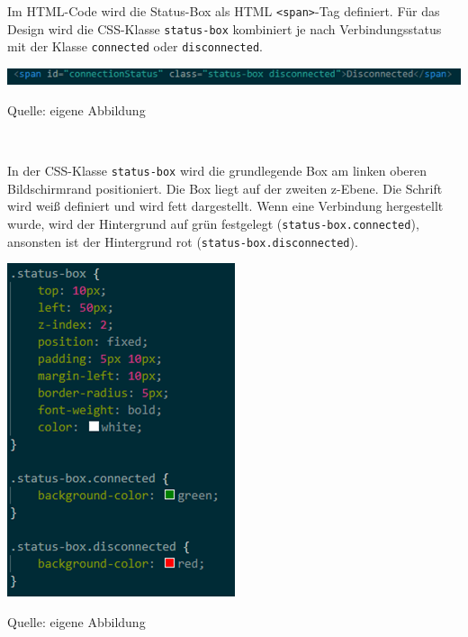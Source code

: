 \documentclass[ngerman,12pt,a4paper]{article}
\begin{document}
	Im HTML-Code wird die Status-Box als HTML \texttt{<span>}-Tag definiert. Für das Design wird die CSS-Klasse \texttt{status-box} kombiniert je nach Verbindungsstatus mit der Klasse \texttt{connected} oder \texttt{disconnected}. \\
	\begin{center}
		\begin{minipage}[t]{1\textwidth}
			\includegraphics{Pictures/status-html}
			\label{fig:status-html}
			\vspace{-10pt}
			\begin{center}
				\par\small Quelle: eigene Abbildung 
			\end{center}
		\end{minipage} \\[0.75cm]
	\end{center}
	In der CSS-Klasse \texttt{status-box} wird die grundlegende Box am linken oberen Bildschirmrand positioniert. Die Box liegt auf der zweiten z-Ebene. Die Schrift wird weiß definiert und wird fett dargestellt. Wenn eine Verbindung hergestellt wurde, wird der Hintergrund auf grün festgelegt (\texttt{status-box.connected}), ansonsten ist der Hintergrund rot (\texttt{status-box.disconnected}). \\[0.5cm]
	\begin{center}
		\begin{minipage}[t]{0.45\textwidth}
			\includegraphics{Pictures/status-css}
			\label{fig:status-css}
			\vspace{-10pt}
			\begin{center}
				\par\small Quelle: eigene Abbildung 
			\end{center}
		\end{minipage} \\[0.75cm]
	\end{center}
\end{document}
